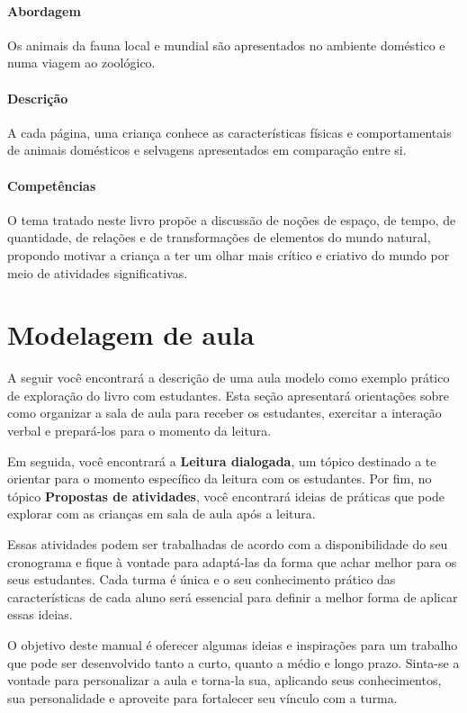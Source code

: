 \documentclass[11pt]{extarticle}
\begin{document}
\paragraph{Abordagem} 
Os animais da fauna local e mundial são apresentados no ambiente 
doméstico e numa viagem ao zoológico.
\paragraph{Descrição} 
A cada página, uma criança conhece as características físicas
e comportamentais de animais domésticos e selvagens apresentados
em comparação entre si. 
\paragraph{Competências} 
O tema tratado neste livro propõe a discussão de noções de espaço, 
de tempo, de quantidade, de relações e de transformações de elementos
do mundo natural, propondo motivar a criança a ter um olhar mais crítico
e criativo do mundo por meio de atividades significativas.

\section{Modelagem de aula}
A seguir você encontrará a descrição de uma aula modelo como exemplo 
prático de exploração do livro com estudantes. Esta seção apresentará 
orientações sobre como organizar a sala de aula para receber os 
estudantes, exercitar a interação verbal e prepará-los para o 
momento da leitura.

Em seguida, você encontrará a \textbf{Leitura dialogada}, um 
tópico destinado a te orientar para o momento específico da 
leitura com os estudantes. Por fim, no tópico 
\textbf{Propostas de atividades}, você encontrará ideias 
de práticas que pode explorar com as crianças em sala de 
aula após a leitura. 

Essas atividades podem ser trabalhadas de acordo com a 
disponibilidade do seu cronograma e fique à vontade para adaptá-las 
da forma que achar melhor para os seus estudantes. Cada turma é única 
e o seu conhecimento prático das características de cada aluno será 
essencial para definir a melhor forma de aplicar essas ideias. 

O objetivo deste manual é oferecer algumas ideias 
e inspirações para um trabalho que pode ser desenvolvido tanto 
a curto, quanto a médio e longo prazo. Sinta-se a vontade para 
personalizar a aula e torna-la sua, aplicando seus conhecimentos, sua 
personalidade e aproveite para fortalecer 
seu vínculo com a turma.
\end{document}
